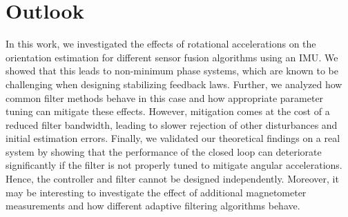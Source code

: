 \section{Outlook} \label{sec:Outlook}
In this work, we investigated the effects of rotational accelerations on the orientation estimation for different sensor fusion algorithms using an \ac{IMU}.
We showed that this leads to non-minimum phase systems, which are known to be challenging when designing stabilizing feedback laws. 
Further, we analyzed how common filter methods behave in this case and how appropriate parameter tuning can mitigate these effects.
However, mitigation comes at the cost of a reduced filter bandwidth, leading to slower rejection of other disturbances and initial estimation errors.
Finally, we validated our theoretical findings on a real system by showing that the performance of the closed loop can deteriorate significantly if the filter is not properly tuned to mitigate angular accelerations.
Hence, the controller and filter cannot be designed independently.
Moreover, it may be interesting to investigate the effect of additional magnetometer measurements and how different adaptive filtering algorithms behave.
